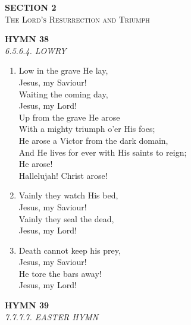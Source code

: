 \newpage
\thispagestyle{empty}
\vspace*{3.5cm}
\begin{center}
    {\LARGE \textbf{SECTION 2}}\\[0.8em]
    {\Large \textsc{The Lord's Resurrection and Triumph}}
\end{center}
\vspace{3.5cm}

\newpage
\begin{center}
    {\Large \textbf{HYMN 38}}
    \\
    \textit{6.5.6.4. LOWRY}
\end{center}
\vspace{1em}

\begin{enumerate}
    \item Low in the grave He lay, \\
        Jesus, my Saviour! \\
        Waiting the coming day, \\
        Jesus, my Lord! \\
        Up from the grave He arose \\
        With a mighty triumph o'er His foes; \\
        He arose a Victor from the dark domain, \\
        And He lives for ever with His saints to reign; \\
        He arose! \\
        Hallelujah! Christ arose!

    \item Vainly they watch His bed, \\
        Jesus, my Saviour! \\
        Vainly they seal the dead, \\
        Jesus, my Lord!

    \item Death cannot keep his prey, \\
        Jesus, my Saviour! \\
        He tore the bars away! \\
        Jesus, my Lord!

\end{enumerate}

\newpage
\begin{center}
    {\Large \textbf{HYMN 39}}
    \\
    \textit{7.7.7.7. EASTER HYMN}
\end{center}
\vspace{1em}

